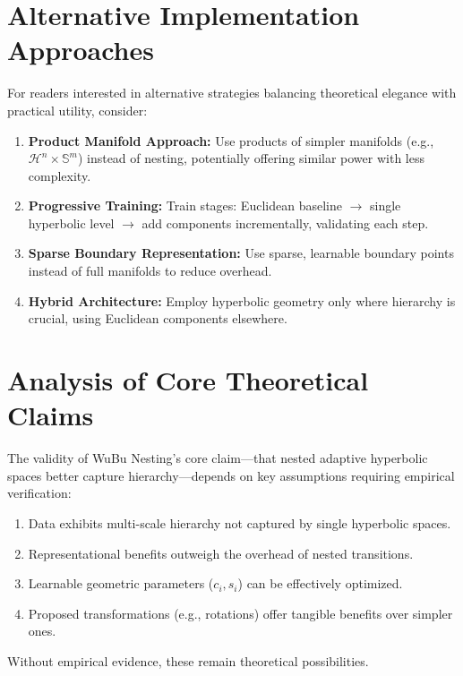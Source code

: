 \documentclass[11pt]{article}
\begin{document}
\appendix %

\section{Alternative Implementation Approaches}
\label{app:alternatives}

For readers interested in alternative strategies balancing theoretical elegance with practical utility, consider:

\begin{enumerate}[noitemsep]
    \item \textbf{Product Manifold Approach:} Use products of simpler manifolds (e.g., $\mathcal{H}^n \times \mathbb{S}^m$) instead of nesting, potentially offering similar power with less complexity.
    \item \textbf{Progressive Training:} Train stages: Euclidean baseline $\rightarrow$ single hyperbolic level $\rightarrow$ add components incrementally, validating each step.
    \item \textbf{Sparse Boundary Representation:} Use sparse, learnable boundary points instead of full manifolds to reduce overhead.
    \item \textbf{Hybrid Architecture:} Employ hyperbolic geometry only where hierarchy is crucial, using Euclidean components elsewhere.
\end{enumerate}

\section{Analysis of Core Theoretical Claims}
\label{app:theory_analysis}

The validity of WuBu Nesting's core claim—that nested adaptive hyperbolic spaces better capture hierarchy—depends on key assumptions requiring empirical verification:

\begin{enumerate}[noitemsep]
    \item Data exhibits multi-scale hierarchy not captured by single hyperbolic spaces.
    \item Representational benefits outweigh the overhead of nested transitions.
    \item Learnable geometric parameters ($c_i, s_i$) can be effectively optimized.
    \item Proposed transformations (e.g., rotations) offer tangible benefits over simpler ones.
\end{enumerate}
Without empirical evidence, these remain theoretical possibilities.
\end{document}
